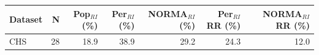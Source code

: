 \begin{table}[ht]
\centering
\footnotesize
\begin{tabular}{lrrrrrr}
\toprule
Dataset & N & Pop$_{RI}$ (\%) & Per$_{RI}$ (\%) & NORMA$_{RI}$ (\%) & Per$_{RI}$ RR (\%) & NORMA$_{RI}$ RR (\%) \\
\midrule
CHS & 28 & 18.9 & 38.9 & 29.2 & 24.3 & 12.0 \\
\bottomrule
\end{tabular}
\label{tab:07_prevalence}
\end{table}